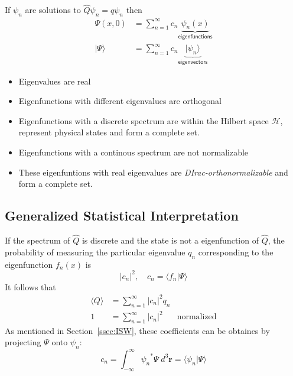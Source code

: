 \newpar{}
If $\psi_n$ are solutions to $\hat{Q}\psi_n=q\psi_n$ then
\noindent\begin{align*}
    \Psi(x,0)    & = \sum_{n=1}^{\infty} c_n \underbrace{\psi_n(x)}_{\textsf{eigenfunctions}}    \\
    |\Psi\rangle & = \sum_{n=1}^{\infty} c_n \underbrace{|\psi_n\rangle}_{\textsf{eigenvectors}}
\end{align*}


\begin{itemize}
    \item Eigenvalues are real
    \item Eigenfunctions with different eigenvalues are orthogonal
    \item Eigenfunctions with a discrete spectrum are within the Hilbert space $\mathcal{H}$, represent physical states and form a complete set.
\end{itemize}


\begin{itemize}
    \item Eigenfunctions with a continous spectrum are not normalizable
    \item These eigenfuntions with real eigenvalues are \textit{DIrac-orthonormalizable} and form a complete set.
\end{itemize}

\subsection{Generalized Statistical Interpretation}
If the spectrum of $\hat{Q}$ is discrete and the state is not a eigenfunction of $\hat{Q}$, the probability of measuring the particular eigenvalue $q_n$ corresponding to the eigenfunction $f_n(x)$ is
\noindent\begin{equation*}
    |c_n|^2, \quad c_n = \langle f_n|\Psi\rangle
\end{equation*}
It follows that
\noindent\begin{align*}
    \langle Q\rangle & = \sum_{n=1}^{\infty} |c_n|^2 q_n                     \\
    1                & =\sum_{n=1}^{\infty} |c_n|^2      & \text{normalized}
\end{align*}
As mentioned in Section\ \ref{ssec:ISW}, these coefficients can be obtaines by projecting $\Psi$ onto $\psi_n$:
\noindent\begin{equation*}
    c_n = \int_{-\infty}^{\infty} {\psi_n}^* \Psi\; d^3 \mathbf{r} = \langle \psi_n |\Psi \rangle
\end{equation*}

